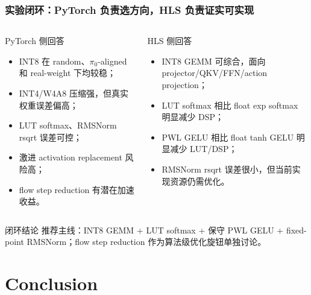 \documentclass[10pt, aspectratio=169]{beamer}
\newcommand{\piZero}{\texorpdfstring{$\pi_0$}{pi0}\xspace}
\begin{document}
\begin{frame}
  \frametitle{实验闭环：PyTorch 负责选方向，HLS 负责证实可实现}
  \small
  \begin{columns}[T,onlytextwidth]
    \begin{block}{PyTorch 侧回答}
      \footnotesize
      \begin{itemize}
        \item INT8 在 random、\piZero-aligned 和 real-weight 下均较稳；
        \item INT4/W4A8 压缩强，但真实权重误差偏高；
        \item LUT softmax、RMSNorm rsqrt 误差可控；
        \item 激进 activation replacement 风险高；
        \item flow step reduction 有潜在加速收益。
      \end{itemize}
    \end{block}

    \begin{alertblock}{HLS 侧回答}
      \footnotesize
      \begin{itemize}
        \item INT8 GEMM 可综合，面向 projector/QKV/FFN/action projection；
        \item LUT softmax 相比 float exp softmax 明显减少 DSP；
        \item PWL GELU 相比 float tanh GELU 明显减少 LUT/DSP；
        \item RMSNorm rsqrt 误差很小，但当前实现资源仍需优化。
      \end{itemize}
    \end{alertblock}
  \end{columns}

  \vspace{3pt}
  \begin{exampleblock}{闭环结论}
    推荐主线：INT8 GEMM + LUT softmax + 保守 PWL GELU + fixed-point RMSNorm；flow step reduction 作为算法级优化旋钮单独讨论。
  \end{exampleblock}
\end{frame}

\section{Conclusion}
\end{document}
